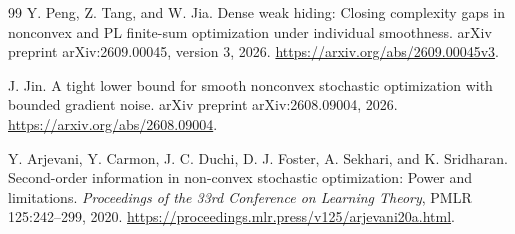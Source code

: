 \documentclass[11pt]{article}
\theoremstyle{definition}
\theoremstyle{remark}
\begin{document}
\begin{thebibliography}{99}
Y. Peng, Z. Tang, and W. Jia.
\newblock Dense weak hiding: Closing complexity gaps in nonconvex and PL finite-sum optimization under individual smoothness.
\newblock arXiv preprint arXiv:2609.00045, version 3, 2026.
\newblock \url{https://arxiv.org/abs/2609.00045v3}.

J. Jin.
\newblock A tight lower bound for smooth nonconvex stochastic optimization with bounded gradient noise.
\newblock arXiv preprint arXiv:2608.09004, 2026.
\newblock \url{https://arxiv.org/abs/2608.09004}.

Y. Arjevani, Y. Carmon, J. C. Duchi, D. J. Foster, A. Sekhari, and K. Sridharan.
\newblock Second-order information in non-convex stochastic optimization: Power and limitations.
\newblock \emph{Proceedings of the 33rd Conference on Learning Theory}, PMLR 125:242--299, 2020.
\newblock \url{https://proceedings.mlr.press/v125/arjevani20a.html}.
\end{thebibliography}
\end{document}
